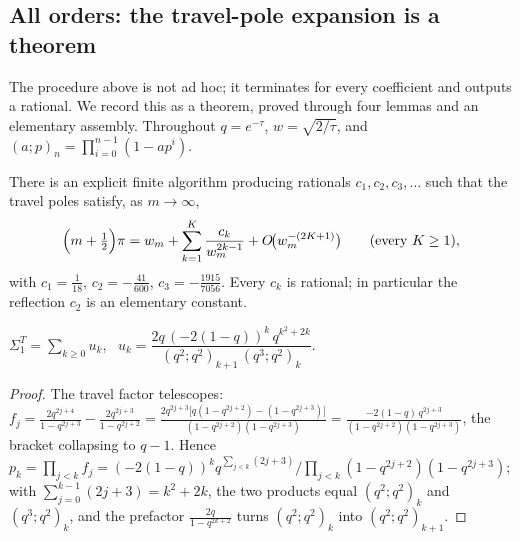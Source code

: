 \subsection{All orders: the travel-pole expansion is a theorem}\label{ss:allorders}
The procedure above is not ad hoc; it terminates for every coefficient and outputs a rational. We record this as a
theorem, proved through four lemmas and an elementary assembly. Throughout $q=e^{-\tau}$, $w=\sqrt{2/\tau}$, and
$(a;p)_n=\prod_{i=0}^{n-1}(1-ap^i)$.

\begin{theorem}\label{thm:mcmahon}
There is an explicit finite algorithm producing rationals $c_1,c_2,c_3,\dots$ such that the travel poles satisfy,
as $m\to\infty$,
\begin{equation}\label{eq:mcmahonall}
  \Bigl(m+\tfrac12\Bigr)\pi=w_m+\sum_{k=1}^{K}\frac{c_k}{w_m^{2k-1}}+O\!\bigl(w_m^{-(2K+1)}\bigr)
  \qquad(\text{every }K\ge1),
\end{equation}
with $c_1=\tfrac1{18}$, $c_2=-\tfrac{41}{600}$, $c_3=-\tfrac{1915}{7056}$. Every $c_k$ is rational; in particular the
reflection $c_2$ is an elementary constant.
\end{theorem}

\begin{lemma}\label{lem:Aclosed}
$\Sigma_1^T=\sum_{k\ge0}u_k$, \ $u_k=\dfrac{2q\,(-2(1-q))^k\,q^{k^2+2k}}{(q^2;q^2)_{k+1}\,(q^3;q^2)_k}$.
\end{lemma}
\begin{proof}
The travel factor telescopes:
$f_j=\frac{2q^{2j+4}}{1-q^{2j+3}}-\frac{2q^{2j+3}}{1-q^{2j+2}}
=\frac{2q^{2j+3}\bigl[q(1-q^{2j+2})-(1-q^{2j+3})\bigr]}{(1-q^{2j+2})(1-q^{2j+3})}
=\frac{-2(1-q)\,q^{2j+3}}{(1-q^{2j+2})(1-q^{2j+3})}$,
the bracket collapsing to $q-1$. Hence $p_k=\prod_{j<k}f_j=(-2(1-q))^k q^{\sum_{j<k}(2j+3)}
\big/\!\prod_{j<k}(1-q^{2j+2})(1-q^{2j+3})$; with $\sum_{j=0}^{k-1}(2j+3)=k^2+2k$, the two products equal
$(q^2;q^2)_k$ and $(q^3;q^2)_k$, and the prefactor $\tfrac{2q}{1-q^{2k+2}}$ turns $(q^2;q^2)_k$ into
$(q^2;q^2)_{k+1}$.
\end{proof}

